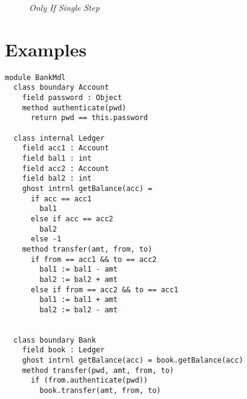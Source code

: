 \documentclass[acmsmall,review,anonymous]{acmart}\settopmatter{printfolios=true,printccs=false,printacmref=false}
\begin{document}
\begin{figure}[t]
\footnotesize
{}
\caption{\emph{Only If Single Step}}
\label{f:only-if-single}
\end{figure}

%

\section{Examples}

\begin{lstlisting}[mathescape=true, frame=lines]
module BankMdl
  class boundary Account
    field password : Object
    method authenticate(pwd)
      return pwd == this.password

  class internal Ledger
    field acc1 : Account
    field bal1 : int
    field acc2 : Account
    field bal2 : int
    ghost intrnl getBalance(acc) = 
      if acc == acc1
        bal1
      else if acc == acc2
        bal2
      else -1
    method transfer(amt, from, to)
      if from == acc1 && to == acc2
        bal1 := bal1 - amt
        bal2 := bal2 + amt
      else if from == acc2 && to == acc1
        bal1 := bal1 + amt
        bal2 := bal2 - amt
      

  class boundary Bank
    field book : Ledger
    ghost intrnl getBalance(acc) = book.getBalance(acc)
    method transfer(pwd, amt, from, to)
      if (from.authenticate(pwd))
        book.transfer(amt, from, to)
\end{lstlisting}
\end{document}
